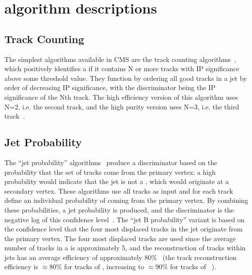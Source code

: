 
\section{\texorpdfstring{\btagging}{b-tagging} algorithm descriptions}
\label{s:btagging_algorithm_descriptions}

\subsection{Track Counting}
\label{ss:track_counting}
The simplest \btagging algorithms available in CMS are the track counting
algorithms~\cite{CMS-PAS-BTV-09-001}, which positively identifies a \bjet if it contains N or more tracks with
IP significance above some threshold value. They function by ordering all good tracks in a jet by order of
decreasing IP significance, with the discriminator being the IP significance of the Nth track. The high
efficiency version of this algorithm uses N=2, i.e. the second track, and the high purity version uses N=3,
i.e. the third track~\cite{CMS-AN-2005-041}.

\subsection{Jet Probability}
\label{ss:jet_probability}
The ``jet probability'' algorithms~\cite{CMS-PAS-BTV-09-001} produce a discriminator based on the probability that
the set of tracks come from the primary vertex: a high probability would indicate that the jet is not a \bjet,
which would originate at a secondary vertex. These algorithms use all tracks as input and for each track
define an individual probability of coming from the primary vertex. By combining these probabilities, a jet
probability is produced, and the discriminator is the negative log of this confidence
level~\cite{CMS-AN-2005-041}. The ``jet B probability'' variant is based on the confidence level that the four
most displaced tracks in the jet originate from the primary vertex. The four most displaced tracks are
used since the average number of tracks in a \bjet is approximately 5, and the reconstruction of tracks within
jets has an average efficiency of approximately 80\%~\cite{CMS-PAS-BTV-09-001} (the track reconstruction
efficiency is $\approx80\%$ for tracks of \GeV, increasing to $\approx90\%$ for tracks of
\GeV~\cite{Khachatryan:2015lha}).

